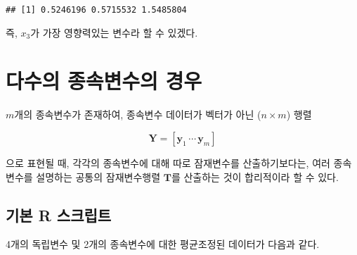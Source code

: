 \documentclass[
]{book}
\begin{document}
\begin{verbatim}
## [1] 0.5246196 0.5715532 1.5485804
\end{verbatim}

즉, \(x_3\)가 가장 영향력있는 변수라 할 수 있겠다.

\hypertarget{plsr-multivariate-target}{%
\section{다수의 종속변수의 경우}\label{plsr-multivariate-target}}

\(m\)개의 종속변수가 존재하여, 종속변수 데이터가 벡터가 아닌 (\(n \times m\)) 행렬

\[\mathbf{Y} = \left[ \mathbf{y}_1 \, \cdots \, \mathbf{y}_m \right]\]

으로 표현될 때, 각각의 종속변수에 대해 따로 잠재변수를 산출하기보다는, 여러 종속변수를 설명하는 공통의 잠재변수행렬 \(\mathbf{T}\)를 산출하는 것이 합리적이라 할 수 있다.

\hypertarget{plsr-multivariate-basic-script}{%
\subsection{기본 R 스크립트}\label{plsr-multivariate-basic-script}}

4개의 독립변수 및 2개의 종속변수에 대한 평균조정된 데이터가 다음과 같다.
\end{document}

